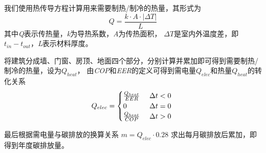 \documentclass[a4paper, 12pt]{article}
\numberwithin{equation}{section}
\begin{document}
            我们使用热传导方程计算用来需要制热/制冷的热量，其形式为
            \begin{equation}
                Q = \frac{k \cdot A \cdot |\Delta T|}{L}
            \end{equation}
            其中\textit{Q}表示传热量，\textit{k}为导热系数，\textit{A}为传热面积，
            $ \Delta T $是室内外温度差，即$ t_{in} - t_{out} $，\textit{L}表示材料厚度。

            将建筑分成墙、门窗、房顶、地面四个部分，分别计算并累加即可得到需要制热/制冷的热量，设为$ Q_{heat} $，
            由\textit{COP}和\textit{EER}的定义可得到需电量$ Q_{elec} $和热量$ Q_{heat} $的转化关系
            \begin{equation}
                Q_{elec} =
                \begin{cases}
                    \frac{Q_{heat}}{EER} & \text{ $ \Delta t < 0 $ } \\
                    0 & \text{ $ \Delta t = 0 $ } \\
                    \frac{Q_{heat}}{COP} & \text{ $ \Delta t > 0 $ }
                \end{cases}
            \end{equation}

            最后根据需电量与碳排放的换算关系 $ m = Q_{elec} \cdot 0.28 $ 求出每月碳排放后累加，即得到年度碳排放量。
\end{document}
